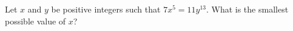 Let $x$ and $y$ be positive integers such that $7x^5=11y^{13}$. What is the smallest possible value of $x$?
